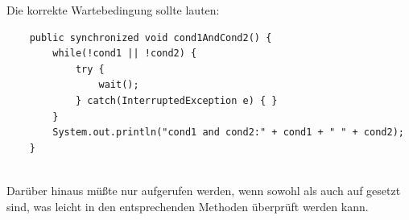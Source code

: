 \noindent
Die korrekte Wartebedingung sollte lauten:

\begin{verbatim}
    public synchronized void cond1AndCond2() {
        while(!cond1 || !cond2) {
            try {
                wait();
            } catch(InterruptedException e) { }
        }
        System.out.println("cond1 and cond2:" + cond1 + " " + cond2);
    }
\end{verbatim}\\

Darüber hinaus müßte  nur aufgerufen werden, wenn sowohl  als auch  auf  gesetzt sind, was leicht in den entsprechenden Methoden überprüft werden kann.